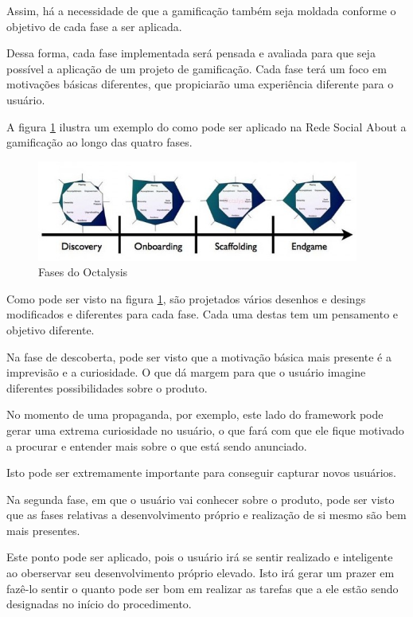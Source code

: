 Assim, há a necessidade de que a gamificação também seja moldada conforme o objetivo de
cada fase a ser aplicada.

Dessa forma, cada fase implementada será pensada e avaliada para que seja possível a
aplicação de um  projeto de gamificação. Cada fase terá um foco em motivações
básicas diferentes, que propiciarão uma experiência diferente para o usuário.

A figura \ref{fig:fasesoctalysis} ilustra um exemplo do como pode ser aplicado na
Rede Social About a gamificação ao longo das quatro fases.

\begin{figure}[h]
    \centering
    \includegraphics[width=400px, scale=1]{figuras/fasesoctalysis}
    \caption{Fases do Octalysis}
    \label{fig:fasesoctalysis}
\end{figure}

Como pode ser visto na figura \ref{fig:fasesoctalysis}, são projetados vários
desenhos e desings modificados e diferentes para cada fase. Cada uma destas
tem um pensamento e objetivo diferente.

Na fase de descoberta, pode ser visto que a motivação básica mais presente é
a imprevisão e a curiosidade. O que dá margem para que o usuário imagine diferentes
possibilidades sobre o produto. 

No momento de uma propaganda, por exemplo, este lado do framework pode gerar uma
extrema curiosidade no usuário, o que fará com que ele fique motivado a procurar
e entender mais sobre o que está sendo anunciado.

Isto pode ser extremamente importante para conseguir capturar novos usuários.

Na segunda fase, em que o usuário vai conhecer sobre o produto, pode ser visto
que as fases relativas a desenvolvimento próprio e realização de si mesmo
são bem mais presentes.

Este ponto pode ser aplicado, pois o usuário irá se sentir realizado e inteligente
ao oberservar seu desenvolvimento próprio elevado. Isto irá gerar um prazer em fazê-lo
sentir o quanto pode ser bom em realizar as tarefas que a ele estão sendo designadas
no início do procedimento.

